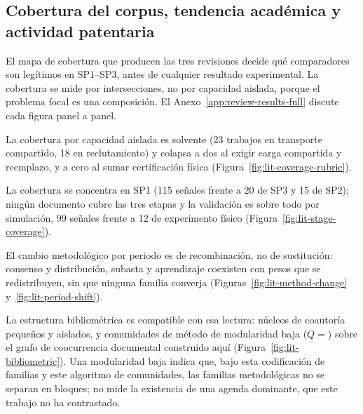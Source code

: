 \subsection{Cobertura del corpus, tendencia académica y actividad patentaria}
\label{subsec:results-review}

El mapa de cobertura que producen las tres revisiones decide qué comparadores son
legítimos en SP1--SP3, antes de cualquier resultado experimental. La cobertura se mide
por intersecciones, no por capacidad aislada, porque el problema focal es una
composición. El Anexo~\ref{app:review-results-full} discute cada figura panel a panel.



La cobertura por capacidad aislada es solvente (23 trabajos en transporte compartido, 18
en reclutamiento) y colapsa a dos al exigir carga compartida y reemplazo, y a cero al
sumar certificación física (Figura~\ref{fig:lit-coverage-rubric}).



La cobertura se concentra en SP1 (115 señales frente a 20 de SP3 y 15 de SP2); ningún
documento cubre las tres etapas y la validación es sobre todo por simulación, 99 señales
frente a 12 de experimento físico (Figura~\ref{fig:lit-stage-coverage}).





El cambio metodológico por periodo es de recombinación, no de sustitución: consenso y
distribución, subasta y aprendizaje coexisten con pesos que se redistribuyen, sin que
ninguna familia converja (Figuras~\ref{fig:lit-method-change}
y~\ref{fig:lit-period-shift}).



La estructura bibliométrica es compatible con esa lectura: núcleos de coautoría
pequeños y aislados, y comunidades de método de modularidad baja
($Q=$\LitMethodModularity{}) sobre el grafo de coocurrencia documental
construido aquí (Figura~\ref{fig:lit-bibliometric}). Una modularidad baja indica
que, bajo esta codificación de familias y este algoritmo de comunidades, las
familias metodológicas no se separan en bloques; no mide la existencia de una
agenda dominante, que este trabajo no ha contrastado.



